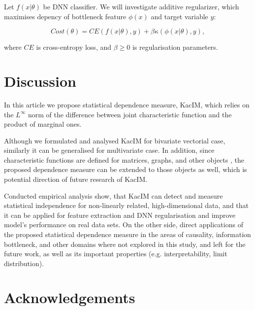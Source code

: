 \documentclass{article}
\begin{document}
Let $f(x|\theta)$ be DNN classifier. We will investigate additive regularizer, which maximises depency of bottleneck feature $\phi(x)$ and target variable $y$: 

\begin{equation}
Cost(\theta) = CE(f(x|\theta),y) + \beta \kappa(\phi(x|\theta),y),
\end{equation}

\noindent where $CE$ is cross-entropy loss, and $\beta \geq 0$ is regularisation parameters.


\section{Discussion} 

\label{section:discussion}
In this article we propose statistical dependence measure, KacIM, which relies on the $L^{\infty}$ norm of the difference between joint characteristic function and the product of marginal ones.

Although we formulated and analysed KacIM for bivariate vectorial case, similarly it can be generalised for multivariate case. In addition, since characteristic functions are defined for matrices, graphs, and other objects \cite{?}, the proposed dependence measure can be extended to those objects as well, which is potential direction of future research of KacIM.

Conducted empirical analysis show, that KacIM can detect and measure statistical independence for non-linearly related, high-dimensional data, and that it can be applied for feature extraction and DNN regularisation and improve model's performance on real data sets. On the other side, direct applications of the proposed statistical dependence measure in the areas of causality, information bottleneck, and other domains where not explored in this study, and left for the future work, as well as its  important properties (e.g. interpretability, limit distribution).

\section{Acknowledgements}


\end{document}
